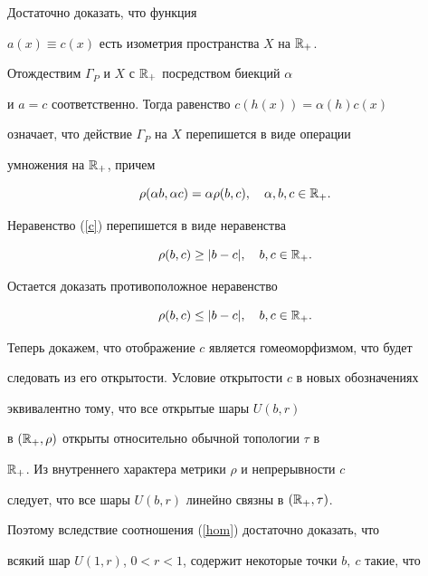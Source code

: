 Достаточно доказать, что функция


$a(x) \equiv c(x)$ есть изометрия пространства $X$ на $\Bbb{R}_{+}$.


Отождествим $\Gamma_{P}$ и $X$ с $\Bbb{R}_{+}$ посредством биекций $\alpha$


и $a=c$ соответственно. Тогда равенство $c(h(x))= \alpha(h)c(x)$


означает, что действие $\Gamma_{P}$ на $X$ перепишется в виде операции


умножения на $\Bbb{R}_{+}$, причем


\begin{equation}


\label{hom}


\rho(\alpha b, \alpha c)= \alpha \rho(b,c),\quad \alpha, b, c \in \Bbb{R}_{+}.


\end{equation}


Неравенство (\ref{c}) перепишется в виде неравенства


\begin{equation}


\label{more}


\rho (b,c) \geq |b-c|,\quad b,c \in \Bbb{R}_{+}.


\end{equation}


Остается доказать противоположное неравенство


$$


\rho (b,c) \leq |b-c|,\quad b,c \in \Bbb{R}_{+}.


$$





Теперь докажем, что отображение $c$ является гомеоморфизмом, что будет


следовать из его открытости. Условие открытости $c$ в новых обозначениях


эквивалентно тому, что все открытые шары $U(b,r)$


в $(\Bbb{R}_{+},\rho)$ открыты относительно обычной топологии $\tau$ в


$\Bbb{R}_{+}$. Из внутреннего характера метрики $\rho$ и непрерывности $c$


следует, что все шары $U(b,r)$ линейно связны в $(\Bbb{R}_{+},\tau)$.


Поэтому вследствие соотношения (\ref{hom}) достаточно доказать, что


всякий шар $U(1,r)$, $0<r<1$, содержит некоторые точки $b,\ c$ такие, что


